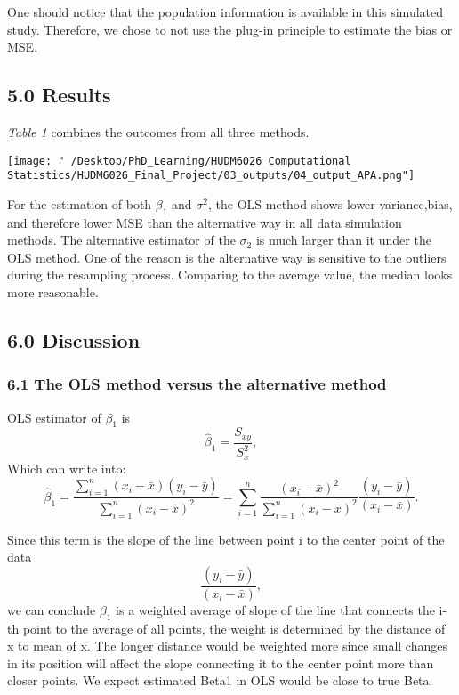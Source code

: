 \documentclass[
]{article}
\begin{document}
One should notice that the population information is available in this
simulated study. Therefore, we chose to not use the plug-in principle to
estimate the bias or MSE.

\hypertarget{results}{%
\subsection{5.0 Results}\label{results}}

\emph{Table 1} combines the outcomes from all three methods.

\texttt{[image: "~/Desktop/PhD\_Learning/HUDM6026 Computational Statistics/HUDM6026\_Final\_Project/03\_outputs/04\_output\_APA.png"]}

For the estimation of both \(\beta_1\) and \(\sigma^2\), the OLS method
shows lower variance,bias, and therefore lower MSE than the alternative
way in all data simulation methods. The alternative estimator of the
\(\sigma_2\) is much larger than it under the OLS method. One of the
reason is the alternative way is sensitive to the outliers during the
resampling process. Comparing to the average value, the median looks
more reasonable.

\hypertarget{discussion}{%
\subsection{6.0 Discussion}\label{discussion}}

\hypertarget{the-ols-method-versus-the-alternative-method}{%
\subsubsection{6.1 The OLS method versus the alternative
method}\label{the-ols-method-versus-the-alternative-method}}

OLS estimator of \(\beta_1\) is \[\hat\beta_1 = \frac{S_{xy}}{S_x^2},\]
Which can write
into:\[\hat\beta_1 =\frac{\sum_{i=1}^{n}(x_i-\bar{x})(y_i-\bar{y})}{\sum_{i=1}^{n}(x_i-\bar{x})^2} = \sum_{i=1}^{n}\frac{(x_i-\bar{x})^2}{\sum_{i=1}^{n}(x_i-\bar{x})^2}\frac{(y_i-\bar{y})}{(x_i-\bar{x})}. \]

Since this term is the slope of the line between point i to the center
point of the data \[\frac{(y_i-\bar{y})}{(x_i-\bar{x})},\] we can
conclude \(\beta_1\) is a weighted average of slope of the line that
connects the i-th point to the average of all points, the weight is
determined by the distance of x to mean of x. The longer distance would
be weighted more since small changes in its position will affect the
slope connecting it to the center point more than closer points. We
expect estimated Beta1 in OLS would be close to true Beta.
\end{document}
